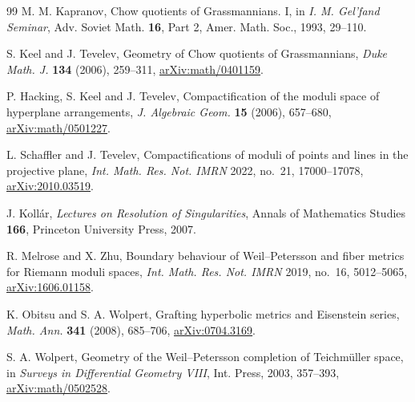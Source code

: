 \documentclass[11pt,a4paper]{ltjsarticle}
\theoremstyle{plain}
\theoremstyle{definition}
\theoremstyle{remark}
\begin{document}
\begin{thebibliography}{99}
M. M. Kapranov,
\newblock Chow quotients of Grassmannians. I,
\newblock in \emph{I. M. Gel'fand Seminar}, Adv. Soviet Math. \textbf{16}, Part 2,
Amer. Math. Soc., 1993, 29--110.

S. Keel and J. Tevelev,
\newblock Geometry of Chow quotients of Grassmannians,
\newblock \emph{Duke Math. J.} \textbf{134} (2006), 259--311,
\newblock \href{https://arxiv.org/abs/math/0401159}{arXiv:math/0401159}.

P. Hacking, S. Keel and J. Tevelev,
\newblock Compactification of the moduli space of hyperplane arrangements,
\newblock \emph{J. Algebraic Geom.} \textbf{15} (2006), 657--680,
\newblock \href{https://arxiv.org/abs/math/0501227}{arXiv:math/0501227}.

L. Schaffler and J. Tevelev,
\newblock Compactifications of moduli of points and lines in the projective plane,
\newblock \emph{Int. Math. Res. Not. IMRN} 2022, no.~21, 17000--17078,
\newblock \href{https://arxiv.org/abs/2010.03519}{arXiv:2010.03519}.

J. Koll\'ar,
\newblock \emph{Lectures on Resolution of Singularities},
\newblock Annals of Mathematics Studies \textbf{166}, Princeton University Press, 2007.

R. Melrose and X. Zhu,
\newblock Boundary behaviour of Weil--Petersson and fiber metrics for Riemann moduli spaces,
\newblock \emph{Int. Math. Res. Not. IMRN} 2019, no.~16, 5012--5065,
\newblock \href{https://arxiv.org/abs/1606.01158}{arXiv:1606.01158}.

K. Obitsu and S. A. Wolpert,
\newblock Grafting hyperbolic metrics and Eisenstein series,
\newblock \emph{Math. Ann.} \textbf{341} (2008), 685--706,
\newblock \href{https://arxiv.org/abs/0704.3169}{arXiv:0704.3169}.

S. A. Wolpert,
\newblock Geometry of the Weil--Petersson completion of Teichm\"uller space,
\newblock in \emph{Surveys in Differential Geometry VIII}, Int. Press, 2003, 357--393,
\newblock \href{https://arxiv.org/abs/math/0502528}{arXiv:math/0502528}.

\end{thebibliography}
\end{document}

